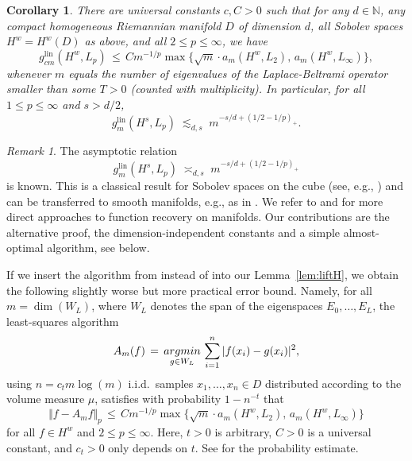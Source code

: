 \documentclass[a4paper,12pt]{amsart}
\newtheorem{corollary}[theorem]{Corollary}
\theoremstyle{definition}
\theoremstyle{remark}
\newtheorem{remark}[theorem]{Remark}
\newcommand{\lin}{\ensuremath{\mathrm{lin}}}
\begin{document}
{\medskip

\begin{corollary}%
    There are universal constants $c,C>0$ such that for any $d\in\mathbb{N}$, any compact homogeneous Riemannian manifold $D$ of dimension $d$, all Sobolev spaces $H^w=H^w(D)$ as above, and all $2\le p \le \infty$,
    we have 
    \[
     g_{cm}^\lin(H^w,L_p) \,\le\, C m^{-1/p} \max\big\{ \sqrt{m} \cdot a_m(H^w,L_2) ,\,  a_m(H^w,L_\infty) \big\},
    \]
    whenever $m$ equals the number of eigenvalues of the Laplace-Beltrami operator smaller than some $T>0$ (counted with multiplicity).
    In particular, for all $1\le p \le \infty$ and $s>d/2$,
    \[
    g_m^\lin(H^s,L_p) 
    \;\lesssim_{d,s}\; 
    m^{-s/d+(1/2-1/p)_+}.
    \]
\end{corollary}

\begin{remark}
The asymptotic relation
\[
 g_m^\lin(H^s,L_p) \;\asymp_{d,s}\; m^{-s/d+(1/2-1/p)_+}
\]
is known.
This is a classical result for Sobolev spaces on the cube (see, e.g., \cite[Chapter~6]{Heinrich})
and can be transferred to smooth manifolds, e.g., as in \cite{KSmani}.
We refer to \cite[Section~3.3]{HM} and \cite{FHJU22,Gr19,LS,Mhaskar,Mhaskar2} for more direct approaches
to function recovery on manifolds.
Our contributions are the alternative proof,
the dimension-independent constants
and a simple almost-optimal algorithm, see below.
\end{remark}

\smallskip

If we insert the algorithm from \cite[Thm.~1]{KU1} instead of \cite[Thm.~23]{DKU} into our Lemma~\ref{lem:liftH},
we obtain the following slightly worse
but more practical error bound.
Namely, for all $m=\dim(W_L)$, where $W_L$ denotes the span of the eigenspaces $E_0,\dots,E_L$, the least-squares algorithm
\begin{equation}\label{eq:algran}
 A_m(f) \,=\, \underset{g \in W_L}{\rm argmin}\, \sum_{i=1}^n |f(x_i)-g(x_i)|^2,
\end{equation}
using $n=c_t m\log(m)$ i.i.d.\ samples $x_1,\dots,x_n\in D$ distributed according to the volume measure $\mu$,
satisfies {with probability $1-n^{-t}$} 
that
\[
 \Vert f - A_m f \Vert_p \,\le\, 
 C m^{-1/p} \max\big\{ \sqrt{m} \cdot a_m(H^w,L_2) ,\,  a_m(H^w,L_\infty) \big\}
\]
for all $f\in H^w$ and $2\le p \le \infty$.
Here, {$t>0$ is arbitrary,
$C>0$ is a universal constant, and $c_t>0$ only depends on $t$.
See \cite[Thm.\,2]{U2020} for the probability estimate.}

}
\end{document}
